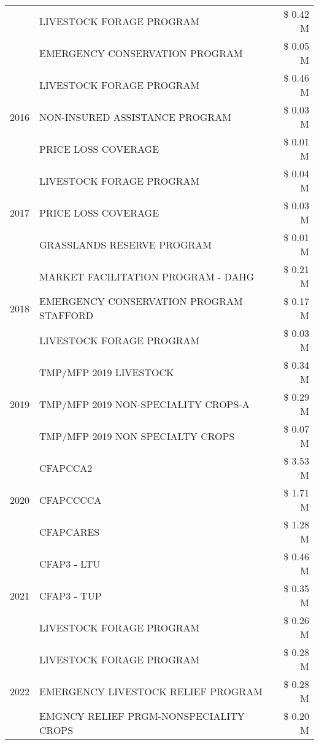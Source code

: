 \begin{tabular}{llr}
 & LIVESTOCK FORAGE PROGRAM & \$ 0.42 M \\
 & EMERGENCY CONSERVATION PROGRAM & \$ 0.05 M \\
\cline{1-3}
\multirow[t]{3}{*}{2016} & LIVESTOCK FORAGE PROGRAM & \$ 0.46 M \\
 & NON-INSURED ASSISTANCE PROGRAM & \$ 0.03 M \\
 & PRICE LOSS COVERAGE & \$ 0.01 M \\
\cline{1-3}
\multirow[t]{3}{*}{2017} & LIVESTOCK FORAGE PROGRAM & \$ 0.04 M \\
 & PRICE LOSS COVERAGE & \$ 0.03 M \\
 & GRASSLANDS RESERVE PROGRAM & \$ 0.01 M \\
\cline{1-3}
\multirow[t]{3}{*}{2018} & MARKET FACILITATION PROGRAM - DAHG & \$ 0.21 M \\
 & EMERGENCY CONSERVATION PROGRAM STAFFORD & \$ 0.17 M \\
 & LIVESTOCK FORAGE PROGRAM & \$ 0.03 M \\
\cline{1-3}
\multirow[t]{3}{*}{2019} & TMP/MFP 2019 LIVESTOCK & \$ 0.34 M \\
 & TMP/MFP 2019 NON-SPECIALITY CROPS-A & \$ 0.29 M \\
 & TMP/MFP 2019 NON SPECIALTY CROPS & \$ 0.07 M \\
\cline{1-3}
\multirow[t]{3}{*}{2020} & CFAPCCA2 & \$ 3.53 M \\
 & CFAPCCCCA & \$ 1.71 M \\
 & CFAPCARES & \$ 1.28 M \\
\cline{1-3}
\multirow[t]{3}{*}{2021} & CFAP3 - LTU & \$ 0.46 M \\
 & CFAP3 - TUP & \$ 0.35 M \\
 & LIVESTOCK FORAGE PROGRAM & \$ 0.26 M \\
\cline{1-3}
\multirow[t]{3}{*}{2022} & LIVESTOCK FORAGE PROGRAM & \$ 0.28 M \\
 & EMERGENCY LIVESTOCK RELIEF PROGRAM & \$ 0.28 M \\
 & EMGNCY RELIEF PRGM-NONSPECIALITY CROPS & \$ 0.20 M \\
\cline{1-3}
\bottomrule
\end{tabular}
